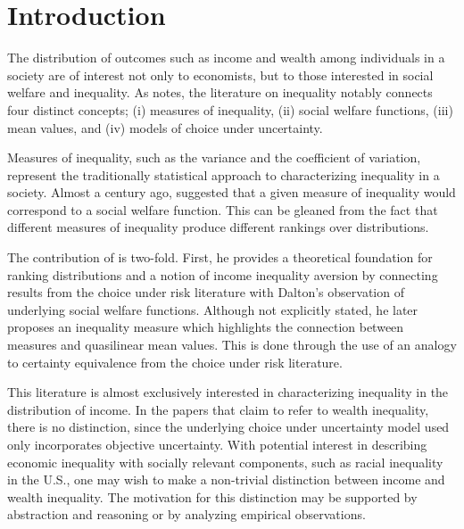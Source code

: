 \documentclass[\econtexRoot/IneqMeas]{subfiles}
\begin{document}
\hypertarget{Introduction}{}
\section{Introduction}\notinsubfile{\label{sec:intro}}
\setcounter{page}{0}


\par The distribution of outcomes such as income and wealth among individuals in a society are of interest not only to economists, but to those interested in social welfare and inequality. As \cite{ch83} notes, the literature on inequality notably connects four distinct concepts; (i) measures of inequality, (ii) social welfare functions, (iii) mean values, and (iv) models of choice under uncertainty.

\par Measures of inequality, such as the variance and the coefficient of variation, represent the traditionally statistical approach to characterizing inequality in a society. Almost a century ago, \cite{hd20} suggested that a given measure of inequality would correspond to a social welfare function. This can be gleaned from the fact that different measures of inequality produce different rankings over distributions.

\par The contribution of \cite{aa70} is two-fold. First, he provides a theoretical foundation for ranking distributions and a notion of income inequality aversion by connecting results from the choice under risk literature with Dalton's observation of underlying social welfare functions. Although not explicitly stated, he later proposes an inequality measure which highlights the connection between measures and quasilinear mean values. This is done through the use of an analogy to certainty equivalence from the choice under risk literature.

\par This literature is almost exclusively interested in characterizing inequality in the distribution of income. In the papers that claim to refer to wealth inequality, there is no  distinction, since the underlying choice under uncertainty model used only incorporates objective uncertainty. With potential interest in describing economic inequality with socially relevant components, such as racial inequality in the U.S., one may wish to make a non-trivial distinction between income and wealth inequality. The motivation for this distinction may be supported by abstraction and reasoning or by analyzing empirical observations.
\end{document}
